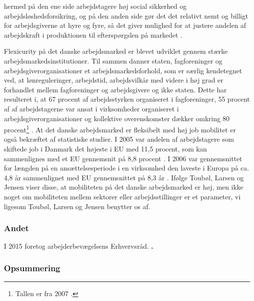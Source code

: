 hermed på den ene side arbejdstagere høj social sikkerhed og arbejdsløshedsforsikring, og på den anden side gør det det relativt nemt og billigt for arbejdsgiverne at hyre og fyre, så det giver mulighed for at justere andelen af arbejdskraft i produktionen til efterspørgslen på markedet \parencite[11]{Touboel2013}.

Flexicurity på det danske arbejdsmarked er blevet udviklet gennem stærke arbejdsmarkedsinstitutioner. Til sammen danner staten, fagforeninger og arbejdsgiverorganisationer et arbejdsmarkedsforhold, som er særlig kendetegnet ved, at lønreguleringer, arbejdstid, arbejdsvilkår med videre i høj grad er forhandlet mellem fagforeninger og arbejdsgivere og ikke staten. Dette har resulteret i, at 67 procent af arbejdsstyrken organiseret i fagforeninger, 55 procent af af arbejdstagerne var ansat i virksomheder organiseret i arbejdsgiverorganisationer og kollektive overenskomster dækker omkring 80 procent\footnote{Tallen er fra 2007 \parencite[11]{Touboel2013}.} \parencite[11]{Touboel2013}. At det danske arbejdsmarked er fleksibelt med høj job mobilitet er også bekræftet af statistiske studier. I 2005 var andelen af arbejdstagere som skiftede job i Danmark det højeste i EU med 11,5 procent, som kan sammenlignes med et EU gennemsnit på 8,8 procent \parencite[21]{Andersen2008}. I 2006 var gennemsnittet for længden på en ansættelsesperiode i en virksomhed den laveste i Europa på ca. 4,8 år sammenlignet med EU gennemsnittet på 8,3 år \parencite[27]{Andersen2008}. Ifølge Toubøl, Larsen og Jensen viser disse, at mobiliteten på det danske arbejdsmarked er høj, men ikke noget om mobiliteten mellem sektorer eller arbejdsstillinger \parencite[11]{Touboel2013}  er et parameter, vi ligesom Toubøl, Larsen og Jensen benytter os af.




\subsubsection{Andet}

I 2015 foretog arbejderbevægelsens Erhvervsråd. \textbf{\parencite{Kirk2015}.}


\subsubsection{Opsummering}





























